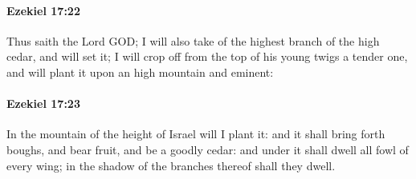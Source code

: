 		\paragraph{Ezekiel 17:22} %
			\label{EZEKIEL-17-22}

			Thus saith the Lord GOD; I will also take of the highest branch of the high cedar, and will set it; I will crop off from the top of his young twigs a tender one, and will plant it upon an high mountain and eminent:


		\paragraph{Ezekiel 17:23} %
			\label{EZEKIEL-17-23}

			In the mountain of the height of Israel will I plant it: and it shall bring forth boughs, and bear fruit, and be a goodly cedar: and under it shall dwell all fowl of every wing; in the shadow of the branches thereof shall they dwell.

